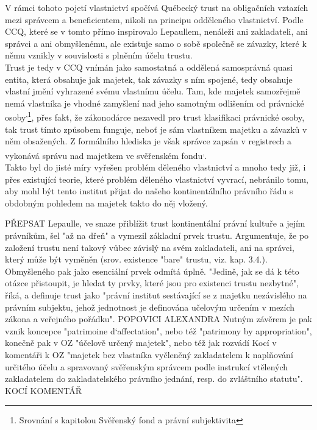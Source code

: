 \documentclass{article}
\begin{document}
V rámci tohoto pojetí vlastnictví spočívá Québecký trust na obligačních vztazích mezi správcem a beneficientem, nikoli na principu odděleného vlastnictví. Podle CCQ, které se v tomto přímo inspirovalo Lepaullem, nenáleži ani zakladateli, ani správci a ani obmyšlenému, ale existuje samo o sobě společně se závazky, které k němu vznikly v souvislosti s plněním účelu trustu.\\

Trust je tedy v CCQ vnímán jako samostatná a oddělená samosprávná quasi entita, která obsahuje jak majetek, tak závazky s ním spojené, tedy obsahuje vlastní jmění vyhrazené svému vlastnímu účelu. Tam, kde majetek samozřejmě nemá vlastníka je vhodné zamyšlení nad jeho samotným odlišením od právnické osoby\textsuperscript{,}\footnote{Srovnání s kapitolou Svěřenský fond a právní subjektivita}, přes fakt, že zákonodárce nezavedl pro trust klasifikaci právnické osoby, tak trust tímto způsobem funguje, neboť je sám vlastníkem majetku a závazků v něm obsažených. Z formálního hlediska je však správce zapsán v registrech a vykonává správu nad majetkem ve svěřenském fondu\textsuperscript{,}.\\

Takto byl do jisté míry vyřešen problém děleného vlastnictví a mnoho tedy již, i přes existující teorie, které problém děleného vlastnictví vyvrací, nebránilo tomu, aby mohl být tento institut přijat do našeho kontinentálního právního řádu s obdobným pohledem na majetek takto do něj vložený.


PŘEPSAT
Lepaulle, ve snaze přiblížit trust kontinentální právní kultuře a jejím právníkům, šel "až na dřeň" a vymezil základní prvek trustu. Argumentuje, že po založení trustu není takový vůbec závislý na svém zakladateli, ani na správci, který může být vyměněn (srov. existence "bare" trustu, viz. kap. 3.4.). Obmyšleného pak jako esenciální prvek odmítá úplně. "Jedině, jak se dá k této otázce přistoupit, je hledat ty prvky, které jsou pro existenci trustu nezbytné", říká, a definuje trust jako "právní institut sestávající se z majetku nezávislého na právním subjektu, jehož jednotnost je definována učelovým určením v mezích zákona a veřejného pořádku". POPOVICI ALEXANDRA Nutným závěrem je pak vznik koncepce "patrimoine d`affectation", nebo též "patrimony by appropriation", konečně pak v OZ "účelově určený majetek", nebo též jak rozvádí Kocí v komentáři k OZ "majetek bez vlastníka vyčleněný zakladatelem k naplňování určitého účelu a spravovaný svěřenským správcem podle instrukcí vtělených zakladatelem do zakladatelského právního jednání, resp. do zvláštního statutu". KOCÍ KOMENTÁŘ 
\end{document}
